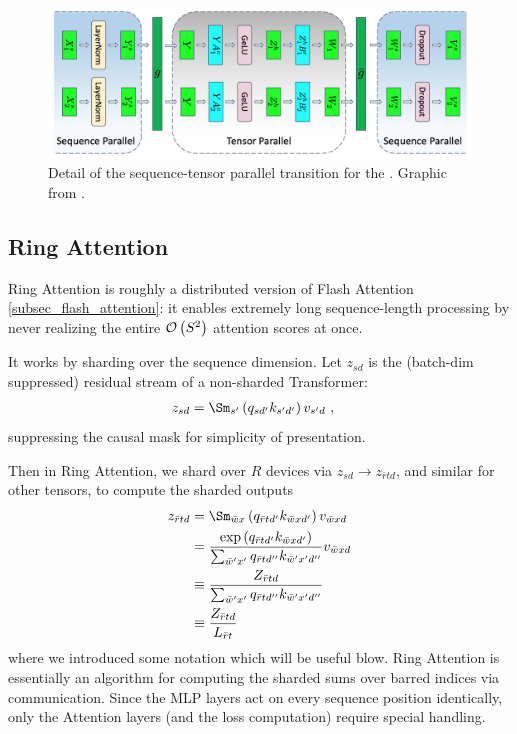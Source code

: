 \documentclass[11pt]{article}
\begin{document}
\begin{figure}[ht]
	\centering
	\includegraphics[scale=.25]{figures/mlp-tensor-sequence-parallel.jpg}
	\caption{Detail of the sequence-tensor parallel transition for the  . Graphic from
		\cite{shoeybi2020megatronlm}. }
	\label{fig_tensor_seq_parallel_detail}
\end{figure}


\subsection{Ring Attention \label{subsec_ring_attention}}

Ring Attention \cite{liu2023ringattentionblockwisetransformers} is roughly a distributed version of
Flash Attention \ref{subsec_flash_attention}: it enables extremely long sequence-length processing
by never realizing the entire $ \mathcal{O} \left( S ^{ 2 } \right)  $ attention scores at once.

It works by sharding over the sequence dimension. Let $ z _{ sd } $ is the (batch-dim suppressed)
residual stream of a non-sharded Transformer:
\begin{align}
    z _{  sd } &= \Sm _{ s' } \left ( q _{ sd' } k _{ s'd' } \right ) v _{ s'd } \ ,
\end{align}
suppressing the causal mask for simplicity of presentation.

Then in Ring Attention, we shard over $ R $ devices via $ z _{ sd } \longrightarrow z _{ \bar{r}td }
$, and similar for other tensors, to compute the sharded outputs
\begin{align}
    z _{  \bar{r}td } &= \Sm _{ \bar{w} x  } \left ( q _{ \bar{r}t d' } k _{ \bar{w}x d' } \right ) v _{ \bar{w}x d }\nn
     &= \frac{ \exp \left ( q _{ \bar{r}t d' } k _{ \bar{w}x d' } \right ) }{ \sum _{ \bar{w}'x' } q _{ \bar{r}t d'' } k _{ \bar{w}'x' d'' }  } v _{ \bar{w}xd }\nn
     &\equiv \frac{ Z _{\bar{r}td } }{   \sum _{ \bar{w}'x' } q _{ \bar{r}t d'' } k _{ \bar{w}'x' d'' }  }\nn
     &\equiv \frac{ Z _{\bar{r}td } }{L _{ \bar{r}t }}
\end{align}
where we introduced some notation which will be useful blow. Ring Attention is essentially an
algorithm for computing the sharded sums over barred indices via communication. Since the MLP layers
act on every sequence position identically, only the Attention layers (and the loss computation)
require special handling.
\end{document}

